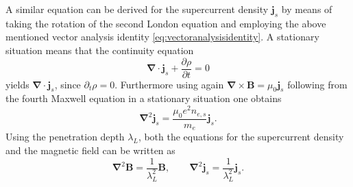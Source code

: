 \documentclass{report}
\numberwithin{tm}{section}
\newcommand\vect[1]{\ensuremath{\bm{#1}}}
\begin{document}
A similar equation can be derived for the supercurrent density $\vect{j}_s$ by means of taking the rotation of the second London equation and employing the above mentioned vector analysis identity \cref{eq:vectoranalysisidentity}. A stationary situation means that the continuity equation \begin{equation}
	\vect{\nabla}\cdot \vect{j}_s + \frac{\partial \rho}{\partial t} = 0
\end{equation} yields $\vect{\nabla}\cdot \vect{j}_s$, since $\partial_t \rho = 0$. Furthermore using again $\vect{\nabla}\times \vect{B} = \mu_0\vect{j}_s$ following from the fourth Maxwell equation in a stationary situation one obtains \begin{equation}
\vect{\nabla}^2\vect{j}_s = \frac{\mu_0 e^2n_{e,s}}{m_e}\vect{j}_s.
\end{equation} Using the penetration depth $\lambda_L$, both the equations for the supercurrent density and the magnetic field can be written as \begin{equation}
\vect{\nabla}^2 \vect{B} = \frac{1}{\lambda_L^2}\vect{B}, \qquad \vect{\nabla}^2 \vect{j}_s = \frac{1}{\lambda_L^2}\vect{j}_s.
\end{equation}
\end{document}
